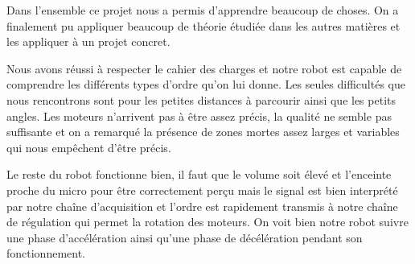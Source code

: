 Dans l’ensemble ce projet nous a permis d’apprendre beaucoup de choses. On a finalement pu appliquer beaucoup de théorie étudiée dans les autres matières et les appliquer à un projet concret. 

Nous avons réussi à respecter le cahier des charges et notre robot est capable de comprendre les différents types d’ordre qu’on lui donne. Les seules difficultés que nous rencontrons sont pour les petites distances à parcourir ainsi que les petits angles. Les moteurs n’arrivent pas à être assez précis, la qualité ne semble pas suffisante et on a remarqué la présence de zones mortes assez larges et variables qui nous empêchent d’être précis. 

Le reste du robot fonctionne bien, il faut que le volume soit élevé et l’enceinte proche du micro pour être correctement perçu mais le signal est bien interprété par notre chaîne d’acquisition et l’ordre est rapidement transmis à notre chaîne de régulation qui permet la rotation des moteurs. On voit bien notre robot suivre une phase d’accélération ainsi qu’une phase de décélération pendant son fonctionnement. 
